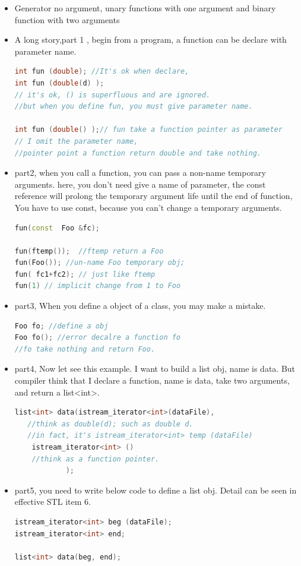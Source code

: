 \documentclass[a4paper,12pt,twoside]{book}
\begin{document}
\begin{itemize}
\item Generator no argument, unary functions with one argument and binary function with two arguments


\item A long story,part 1 , begin from a program, a function can be declare with parameter name.
\begin{lstlisting}[frame=single, language=c++]
int fun (double); //It's ok when declare,
int fun (double(d) );
// it's ok, () is superfluous and are ignored.
//but when you define fun, you must give parameter name.

int fun (double() );// fun take a function pointer as parameter
// I omit the parameter name,
//pointer point a function return double and take nothing.
\end{lstlisting}

\item part2, when you call a function, you can pass a non-name temporary arguments.  here, you don't need give a name of parameter, the const reference will prolong the temporary argument life until the end of function, You have to use const, because you can't change a temporary arguments.

\begin{lstlisting}[frame=single, language=c++]
fun(const  Foo &fc);

fun(ftemp());  //ftemp return a Foo
fun(Foo()); //un-name Foo temporary obj;
fun( fc1+fc2); // just like ftemp
fun(1) // implicit change from 1 to Foo
\end{lstlisting}

\item part3, When you define a object of a class, you may make a mistake.

\begin{lstlisting}[frame=single, language=c++]
Foo fo; //define a obj
Foo fo(); //error decalre a function fo
//fo take nothing and return Foo.
\end{lstlisting}

\item part4, Now let see this example. I want to build a list obj, name is data. But compiler think that I declare a function, name is data, take two arguments, and return a list<int>.
\begin{lstlisting}[frame=single, language=c++]
list<int> data(istream_iterator<int>(dataFile),
   //think as double(d); such as double d.
   //in fact, it's istream_iterator<int> temp (dataFile)
    istream_iterator<int> ()
    //think as a function pointer.
            );
\end{lstlisting}
\item part5, you need to write below code to define a list obj. Detail can be seen in effective STL item 6.
\begin{lstlisting}[frame=single, language=c++]
istream_iterator<int> beg (dataFile);
istream_iterator<int> end;

list<int> data(beg, end);
\end{lstlisting}

\end{itemize}
\end{document}
